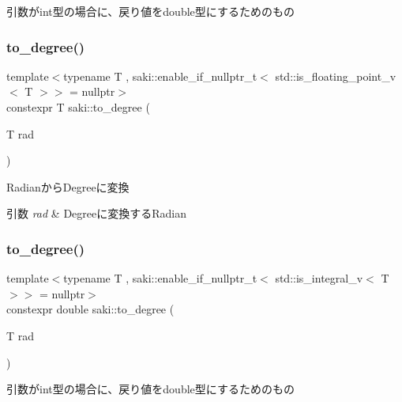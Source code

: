 引数がint型の場合に、戻り値をdouble型にするためのもの 

\mbox{\label{namespacesaki_af9f6d8f2c0663a0452c7edd17bf5daf0}} 
\subsubsection{\texorpdfstring{to\+\_\+degree()}{to\_degree()}\hspace{0.1cm}{\footnotesize\ttfamily [1/2]}}
{\footnotesize\ttfamily template$<$typename T , saki\+::enable\+\_\+if\+\_\+nullptr\+\_\+t$<$ std\+::is\+\_\+floating\+\_\+point\+\_\+v$<$ T $>$$>$  = nullptr$>$ \\
constexpr T saki\+::to\+\_\+degree (\begin{DoxyParamCaption}\item[{T}]{rad }\end{DoxyParamCaption})}



Radianから\+Degreeに変換 


\begin{DoxyParams}{引数}
{\em rad} & Degreeに変換する\+Radian \\
\hline
\end{DoxyParams}
\mbox{\label{namespacesaki_aa7cb33956f8d7354b485aee878d7805d}} 
\subsubsection{\texorpdfstring{to\+\_\+degree()}{to\_degree()}\hspace{0.1cm}{\footnotesize\ttfamily [2/2]}}
{\footnotesize\ttfamily template$<$typename T , saki\+::enable\+\_\+if\+\_\+nullptr\+\_\+t$<$ std\+::is\+\_\+integral\+\_\+v$<$ T $>$$>$  = nullptr$>$ \\
constexpr double saki\+::to\+\_\+degree (\begin{DoxyParamCaption}\item[{T}]{rad }\end{DoxyParamCaption})}



引数がint型の場合に、戻り値をdouble型にするためのもの 

\mbox{\label{namespacesaki_a27595b1e53058ce792db7f8d29e2e9af}} 
